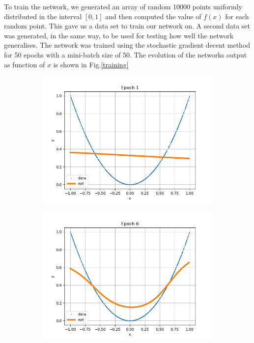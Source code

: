 \documentclass[12pt,a4paper]{article}
\begin{document}
To train the network, we generated an array of random 10000 points uniformly distributed in the interval $[0,1]$ and then computed the value of $f(x)$ for each random point. This gave us a data set to train our network on. A second data set was generated, in the same way, to be used for testing how well the network generalises. The network was trained using the stochastic gradient decent method for 50 epochs with a mini-batch size of 50. The evolution of the networks output as function of $x$ is shown in Fig.\ref{training}

\begin{figure}
\begin{subfigure}{.32\textwidth}
\includegraphics[scale=0.3]{Images/ALearningNet1.png}
\caption{}
\label{training1}
\end{subfigure}
\begin{subfigure}{.32\textwidth}
\includegraphics[scale=0.3]{Images/ALearningNet6.png}

\end{subfigure}
\end{figure}
\end{document}
